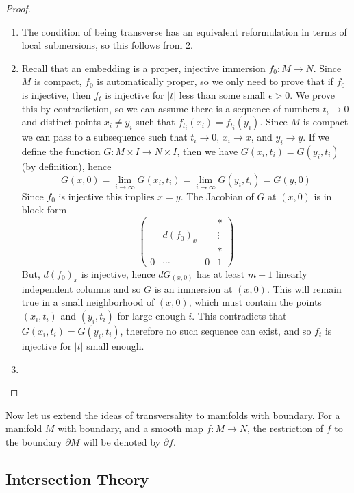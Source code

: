 \begin{proof}
\begin{enumerate}
	\item The condition of being transverse has an equivalent reformulation in terms of local submersions, so this follows from 2.
	
	\item Recall that an embedding is a proper, injective immersion $f_0 : M \rightarrow N$. Since $M$ is compact, $f_0$ is automatically proper, so we only need to prove that if $f_0$ is injective, then $f_t$ is injective for $|t|$ less than some small $\epsilon>0$. We prove this by contradiction, so we can assume there is a sequence of numbers $t_i \to 0$ and distinct points $x_i \neq y_i$ such that $f_{t_i}(x_i) = f_{t_i}(y_i)$. Since $M$ is compact we can pass to a subsequence such that $t_i \to 0$, $x_i \to x$, and $y_i \to y$. If we define the function $G : M \times I \rightarrow N \times I$, then we have $G(x_i,t_i)=G(y_i,t_i)$ (by definition), hence
	\[ G(x,0) = \lim_{i\to\infty} G(x_i,t_i) = \lim_{i\to\infty} G(y_i,t_i) = G(y,0) \]
	Since $f_0$ is injective this implies $x=y$. The Jacobian of $G$ at $(x,0)$ is in block form
	\[ \begin{pmatrix} & & & * \\ & d(f_0)_x & & \vdots \\ & & & * \\ 0 & \cdots & 0 & 1 \end{pmatrix} \]
	But, $d(f_0)_x$ is injective, hence $dG_{(x,0)}$ has at least $m+1$ linearly independent columns and so $G$ is an immersion at $(x,0)$. This will remain true in a small neighborhood of $(x,0)$, which must contain the points $(x_i,t_i)$ and $(y_i,t_i)$ for large enough $i$. This contradicts that $G(x_i,t_i)=G(y_i,t_i)$, therefore no such sequence can exist, and so $f_t$ is injective for $|t|$ small enough.
	
	\item 
	
\end{enumerate}
\end{proof}


Now let us extend the ideas of transversality to manifolds with boundary. For a manifold $M$ with boundary, and a smooth map $f : M \rightarrow N$, the restriction of $f$ to the boundary $\partial M$ will be denoted by $\partial f$. 


\unfinished






\subsection{Intersection Theory}
\label{Intersection Theory}

